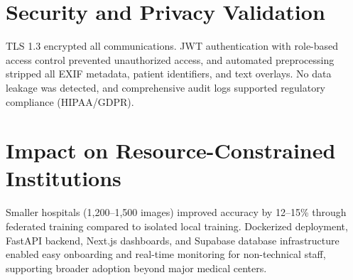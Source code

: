 \section{Security and Privacy Validation}
\label{sec:security}

TLS 1.3 encrypted all communications. JWT authentication with role-based access control prevented unauthorized access, and automated preprocessing stripped all EXIF metadata, patient identifiers, and text overlays. No data leakage was detected, and comprehensive audit logs supported regulatory compliance (HIPAA/GDPR).

\section{Impact on Resource-Constrained Institutions}
\label{sec:impact}

Smaller hospitals (1,200–1,500 images) improved accuracy by 12–15\% through federated training compared to isolated local training. Dockerized deployment, FastAPI backend, Next.js dashboards, and Supabase database infrastructure enabled easy onboarding and real-time monitoring for non-technical staff, supporting broader adoption beyond major medical centers.
